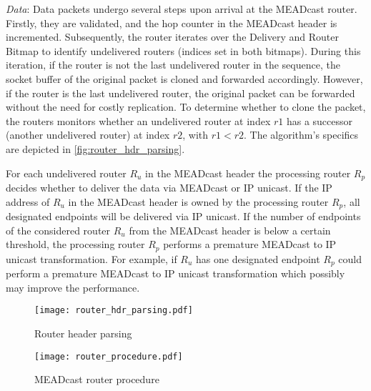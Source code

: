 \textit{Data}: Data packets undergo several steps upon arrival at the MEADcast
    router.
Firstly, they are validated, and the hop counter in the MEADcast header is
    incremented.
Subsequently, the router iterates over the Delivery and Router Bitmap to
    identify undelivered routers (indices set in both bitmaps).
During this iteration, if the router is not the last undelivered router in the
    sequence, the socket buffer of the original packet is cloned and forwarded
    accordingly.
However, if the router is the last undelivered router, the original packet can
    be forwarded without the need for costly replication.
To determine whether to clone the packet, the routers monitors whether an 
    undelivered router at index $r1$ has a successor (another undelivered
    router) at index $r2$, with $r1 < r2$.
The algorithm's specifics are depicted in \autoref{fig:router_hdr_parsing}.

For each undelivered router $R_u$ in the MEADcast header the processing router
    $R_p$ decides whether to deliver the data via MEADcast or IP unicast.
If the IP address of $R_u$ in the MEADcast header is owned by the processing
    router $R_p$, all designated endpoints will be delivered via IP unicast.
If the number of endpoints of the considered router $R_u$ from the MEADcast
    header is below a certain threshold, the processing router $R_p$ performs a
    premature MEADcast to IP unicast transformation.
For example, if $R_u$ has one designated endpoint $R_p$ could perform a
    premature MEADcast to IP unicast transformation which possibly may
    improve the performance.

%
\begin{figure}
    \begin{center}
        \texttt{[image: router\_hdr\_parsing.pdf]}
    \end{center}
    \caption{Router header parsing}
    \label{fig:router_hdr_parsing}
\end{figure}

\begin{figure}
    \begin{center}
        \texttt{[image: router\_procedure.pdf]}
    \end{center}
    \caption{MEADcast router procedure}
    \label{fig:router_procedure}
\end{figure}



